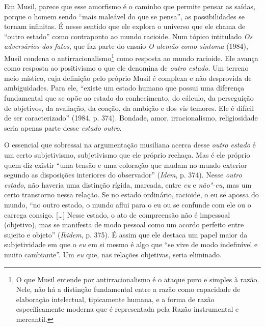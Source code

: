 Em Musil, parece que esse amorfismo é o caminho que permite pensar as
saídas, porque o homem sendo ``mais maleável do que se pensa'', as
possibilidades se tornam infinitas. É nesse sentido que ele explora o
universo que ele chama de ``outro estado'' como contraponto ao mundo
racioide. Num tópico intitulado \emph{Os adversários dos fatos}, que faz
parte do ensaio \emph{O alemão como sintoma} (1984), Musil condena o
antirracionalismo\footnote{O que Musil entende por antirracionalismo é o
  ataque puro e simples à razão. Nele, não há a distinção fundamental
  entre a razão como capacidade de elaboração intelectual, tipicamente
  humana, e a forma de razão específicamente moderna que é representada
  pela Razão instrumental e mercantil.} como resposta ao mundo racioide.
Ele avança como resposta ao positivismo o que ele denomina de
\emph{outro estado}. Um terreno meio místico, cuja definição pelo
próprio Musil é complexa e não desprovida de ambiguidades. Para ele,
``existe um estado humano que possui uma diferença fundamental que se
opõe ao estado do conhecimento, do cálculo, da perseguição de objetivos,
da avaliação, da coação, da ambição e dos vis temores. Ele é difícil de
ser caracterizado'' (1984, p. 374). Bondade, amor, irracionalismo,
religiosidade seria apenas parte desse \emph{estado outro}.

O essencial que sobressai na argumentação musiliana acerca desse
\emph{outro estado} é um certo subjetivismo, subjetivismo que ele
próprio rechaça. Mas é ele próprio quem diz existir ``uma tensão e uma
coloração que mudam no mundo exterior segundo as disposições interiores
do observador'' (\emph{Idem}, p. 374). Nesse \emph{outro estado}, não haveria
uma distinção rígida, marcada, entre \emph{eu} e \emph{não"-eu}, mas um
certo transtorno nessa relação. Se no estado ordinário, racioide, o eu
se apossa do mundo, ``no outro estado, o mundo aflui para o eu ou se
confunde com ele ou o carrega consigo. [\ldots{}] Nesse estado, o
ato de compreensão não é impessoal (objetivo), mas se manifesta de modo
pessoal como um acordo perfeito entre sujeito e objeto'' (\emph{Ibidem},
p. 375). É assim que ele destaca um papel maior da subjetividade em que
o \emph{eu} em si mesmo é algo que ``se vive de modo indefinível e muito
cambiante''. Um \emph{eu} que, nas relações objetivas, seria eliminado.

